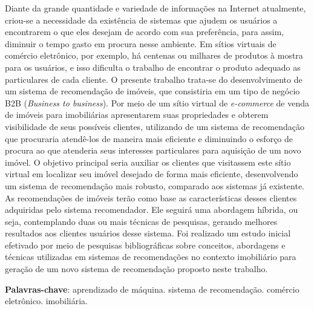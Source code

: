 \begin{resumo}

Diante da grande quantidade e variedade de informações na Internet atualmente, criou-se a necessidade da existência de sistemas que ajudem os usuários a encontrarem o que eles desejam de acordo com sua preferência, para assim, diminuir o tempo gasto em procura nesse ambiente. Em sítios virtuais de comércio eletrônico, por exemplo, há centenas ou milhares de produtos à mostra para os usuários, e isso dificulta o trabalho de encontrar o produto adequado as particulares de cada cliente. O presente trabalho trata-se do desenvolvimento de um sistema de recomendação de imóveis, que consistiria em um tipo de negócio B2B (\textit{Business to business}). Por meio de um sítio virtual de \textit{e-commerce} de venda de imóveis para imobiliárias apresentarem suas propriedades e obterem visibilidade de seus possíveis clientes, utilizando de um sistema de recomendação que procuraria atendê-los de maneira mais eficiente e diminuindo o esforço de procura ao que atenderia seus interesses particulares para aquisição de um novo imóvel. O objetivo principal seria auxiliar os clientes que visitassem este sítio virtual em localizar seu imóvel desejado de forma mais eficiente, desenvolvendo um sistema de recomendação mais robusto, comparado aos sistemas já existente. As recomendações de imóveis terão como base as características desses clientes adquiridas pelo sistema recomendador. Ele seguirá uma abordagem híbrida, ou seja, contemplando duas ou mais técnicas de pesquisas, gerando melhores resultados aos clientes usuários desse sistema. Foi realizado um estudo inicial efetivado por meio de pesquisas bibliográficas sobre conceitos, abordagens e técnicas utilizadas em sistemas de recomendações no contexto imobiliário para geração de um novo sistema de recomendação proposto neste trabalho.

 \vspace{\onelineskip}
    
 \noindent
 \textbf{Palavras-chave}: aprendizado de máquina. sistema de recomendação. comércio eletrônico. imobiliária.
\end{resumo}
